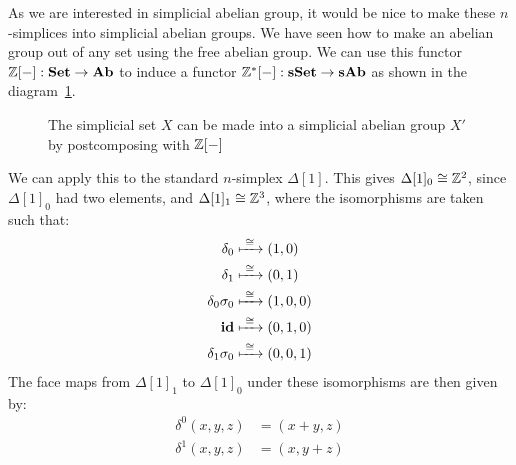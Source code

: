 As we are interested in simplicial abelian group, it would be nice to make these $n$-simplices into simplicial abelian groups. We have seen how to make an abelian group out of any set using the free abelian group. We can use this functor $\mathbb{Z}[-] : \mathbf{Set} \to \mathbf{Ab}$ to induce a functor $\mathbb{Z}^\ast[-] : \mathbf{sSet} \to \mathbf{sAb}$ as shown in the diagram~\ref{fig:diagram_Z}.
\begin{figure}
	\caption{The simplicial set $X$ can be made into a simplicial abelian group $X'$ by postcomposing with $\mathbb{Z}[-]$}
	\label{fig:diagram_Z}
\end{figure}

\begin{example}
	We can apply this to the standard $n$-simplex $\Delta[1]$. This gives $\Delta[1]_0 \cong \mathbb{Z}^2$, since $\Delta[1]_0$ had two elements, and $\Delta[1]_1 \cong \mathbb{Z}^3$, where the isomorphisms are taken such that:
	\begin{align*}
		\delta_0         &\xmapsto{\,\,{\cong}\,\,} (1, 0) \\
		\delta_1         &\xmapsto{\,\,{\cong}\,\,} (0, 1) \\
		\delta_0\sigma_0 &\xmapsto{\,\,{\cong}\,\,} (1, 0, 0) \\
		\mathbf{id}              &\xmapsto{\,\,{\cong}\,\,} (0, 1, 0) \\
		\delta_1\sigma_0 &\xmapsto{\,\,{\cong}\,\,} (0, 0, 1)
	\end{align*}
	The face maps from $\Delta[1]_1$ to $\Delta[1]_0$ under these isomorphisms are then given by:
	\begin{align*}
		\delta^0(x, y, z) &= (x+y, z) \\
		\delta^1(x, y, z) &= (x, y+z)
	\end{align*}
\end{example}
